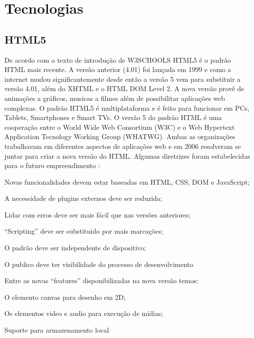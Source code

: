 \part{Tecnologias}

\chapter{HTML5}
De acordo com o texto de introdução de W3SCHOOLS HTML5 é o padrão HTML mais recente. A versão anterior (4.01) foi lançada em 1999 e como a internet mudou significantemente desde então a versão 5 vem para substituir a versão 4.01, além do XHTML e o HTML DOM Level 2. A nova versão provê de animações a gráficos, musicas a filmes além de possibilitar aplicações web complexas. O padrão HTML5 é multiplataforma e é feito para funcionar em PCs, Tablets, Smartphones e Smart TVs.
	O versão 5 do padrão HTML é uma cooperação entre o World Wide Web Consortium (W3C) e o Web Hypertext Application Tecnology Working Group (WHATWG). Ambas as organizações trabalhavam em diferentes aspectos de aplicações web e em 2006 resolveram se juntar para criar a nova versão do HTML. Algumas diretrizes foram estabelecidas para o futuro empreendimento \cite{htmlInt}:

\begin{alineas}

\item Novas funcionalidades devem estar baseadas em HTML, CSS, DOM e JavaScript;

\item A necessidade de plugins externos deve ser reduzida;

\item Lidar com erros deve ser mais fácil que nas versões anteriores;

\item “Scripting” deve ser substituido por mais marcações;

\item O padrão deve ser independente de dispositivo;

\item O publico deve ter visibilidade do processo de desenvolvimento

\end{alineas}

Entre as novas “features” disponibilizadas na nova versão temos:

\begin{alineas}

\item O elemento canvas para desenho em 2D;

\item Os elementos video e audio para execução de mídias;

\item Suporte para armazenamento local

\end{alineas}


